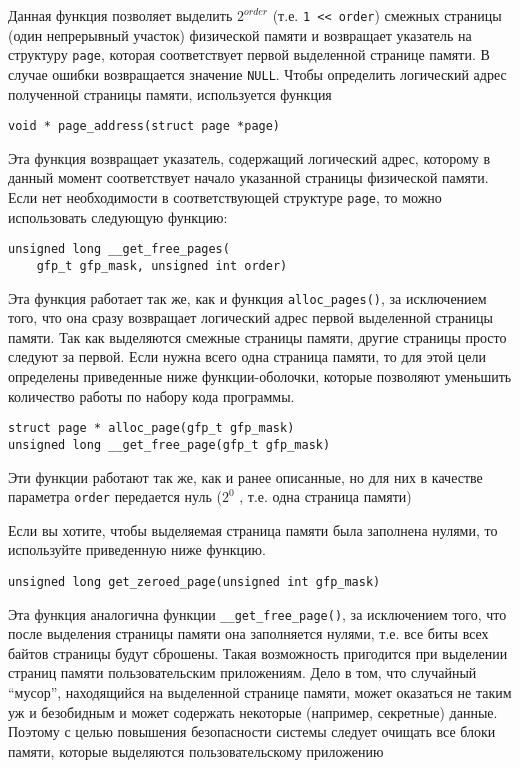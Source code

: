 \documentclass[12pt]{article}
\begin{document}
Данная функция позволяет выделить $2^{order}$ (т.е. \verb!1 << order!) смежных страницы
(один непрерывный участок) физической памяти и возвращает указатель на структуру
\verb!page!, которая соответствует первой выделенной странице памяти.
В случае ошибки возвращается значение \verb!NULL!. Чтобы определить логический адрес полученной страницы памяти,
используется функция

\begin{lstlisting}
void * page_address(struct page *page)
\end{lstlisting}

Эта функция возвращает указатель, содержащий логический адрес, которому в данный момент соответствует
начало указанной страницы физической памяти. Если нет необходимости в соответствующей структуре \verb!page!,
то можно использовать следующую функцию:

\begin{lstlisting}
unsigned long __get_free_pages(
    gfp_t gfp_mask, unsigned int order)
\end{lstlisting}

Эта функция работает так же, как и функция \verb!alloc_pages()!, за исключением того,
что она сразу возвращает логический адрес первой выделенной страницы памяти. Так
как выделяются смежные страницы памяти, другие страницы просто следуют за первой.
Если нужна всего одна страница памяти, то для этой цели определены приведенные
ниже функции-оболочки, которые позволяют уменьшить количество работы по набору
кода программы.

\begin{lstlisting}
struct page * alloc_page(gfp_t gfp_mask)
unsigned long __get_free_page(gfp_t gfp_mask)
\end{lstlisting}

Эти функции работают так же, как и ранее описанные, но для них в качестве параметра \verb!order! передается нуль ($2^0$
, т.е. одна страница памяти)

Если вы хотите, чтобы выделяемая страница памяти была заполнена нулями, то используйте приведенную ниже функцию.

\begin{lstlisting}
unsigned long get_zeroed_page(unsigned int gfp_mask)
\end{lstlisting}

Эта функция аналогична функции \verb!__get_free_page()!, за исключением того, что
после выделения страницы памяти она заполняется нулями, т.е. все биты всех байтов
страницы будут сброшены. Такая возможность пригодится при выделении страниц памяти пользовательским приложениям.
Дело в том, что случайный “мусор”, находящийся на выделенной странице памяти,
может оказаться не таким уж и безобидным и может содержать некоторые (например, секретные) данные.
Поэтому с целью повышения безопасности системы следует очищать все блоки памяти,
которые выделяются пользовательскому приложению
\end{document}
